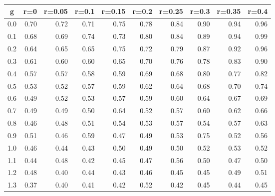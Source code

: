 %
\begin{table}[!tbp]
 \begin{center}
 \begin{tabular}{rrrrrrrrrr}\hline\hline
\multicolumn{1}{c}{g}&\multicolumn{1}{c}{r=0}&\multicolumn{1}{c}{r=0.05}&\multicolumn{1}{c}{r=0.1}&\multicolumn{1}{c}{r=0.15}&\multicolumn{1}{c}{r=0.2}&\multicolumn{1}{c}{r=0.25}&\multicolumn{1}{c}{r=0.3}&\multicolumn{1}{c}{r=0.35}&\multicolumn{1}{c}{r=0.4}\tabularnewline
\hline
0.0&0.70&0.72&0.71&0.75&0.78&0.84&0.90&0.94&0.96\tabularnewline
0.1&0.68&0.69&0.74&0.73&0.80&0.84&0.89&0.94&0.99\tabularnewline
0.2&0.64&0.65&0.65&0.75&0.72&0.79&0.87&0.92&0.96\tabularnewline
0.3&0.61&0.60&0.60&0.65&0.70&0.76&0.78&0.83&0.90\tabularnewline
0.4&0.57&0.57&0.58&0.59&0.69&0.68&0.80&0.77&0.82\tabularnewline
0.5&0.53&0.52&0.57&0.59&0.62&0.64&0.68&0.70&0.74\tabularnewline
0.6&0.49&0.52&0.53&0.57&0.59&0.60&0.64&0.67&0.69\tabularnewline
0.7&0.49&0.49&0.50&0.64&0.52&0.57&0.60&0.62&0.66\tabularnewline
0.8&0.46&0.48&0.51&0.54&0.53&0.57&0.54&0.57&0.63\tabularnewline
0.9&0.51&0.46&0.59&0.47&0.49&0.53&0.75&0.52&0.56\tabularnewline
1.0&0.46&0.44&0.43&0.50&0.49&0.50&0.52&0.53&0.52\tabularnewline
1.1&0.44&0.48&0.42&0.45&0.47&0.56&0.50&0.47&0.50\tabularnewline
1.2&0.48&0.40&0.44&0.43&0.46&0.45&0.45&0.49&0.51\tabularnewline
1.3&0.37&0.40&0.41&0.42&0.52&0.42&0.45&0.44&0.45\tabularnewline
\hline
\end{tabular}

\end{center}

\end{table}


